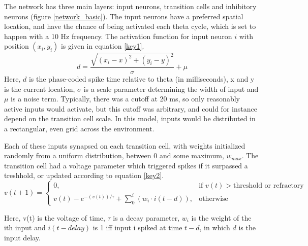 \documentclass{article}
\begin{document}
    The network has three main layers: input neurons, transition cells and inhibitory neurons (figure \ref{network_basic}). The input neurons have a preferred spatial location, and have the chance of being activated each theta cycle, which is set to happen with a 10 Hz frequency. The activation function for input neuron \(i\) with position \((x_i, y_i)\) is given in equation \ref{key1}. \begin{equation} \label{key1} d = \frac{\sqrt{(x_i - x)^2 + (y_i - y)^2}}{\sigma} + \mu\end{equation}
    Here, \(d\) is the phase-coded spike time relative to theta (in milliseconds), x and y is the current location, \(\sigma\) is a scale parameter determining the width of input and \(\mu\) is a noise term. Typically, there was a cutoff at 20 ms, so only reasonably active inputs would activate, but this cutoff was arbitrary, and could for instance depend on the transition cell scale. In this model, inputs would be distributed in a rectangular, even grid across the environment.
    
    Each of these inputs synapsed on each transition cell, with weights initialized randomly from a uniform distribution, between 0 and some maximum, \(w_{max}\). The transition cell had a voltage parameter which triggered spikes if it surpassed a treshhold, or updated according to equation \ref{key2}. 
    \begin{equation} \label{key2} v(t+1) =  \begin{cases} 0, & \text{if } v(t) > \text{threshold or refractory}\\ v(t) - e^{-(v(t)) / \tau} + \sum_{0}^{i} (w_{i} \cdot i(t-d)), & \text{otherwise} \end{cases} \end{equation}
    
    Here, v(t) is the voltage of time, \(\tau\) is a decay parameter, \(w_{i}\) is the weight of the ith input and \(i(t-delay)\) is 1 iff input i spiked at time \(t-d\), in which \(d\) is the input delay.
\end{document}
